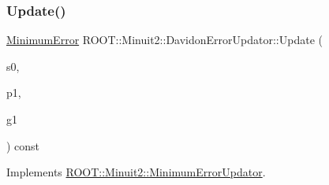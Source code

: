 \subsubsection{\texorpdfstring{Update()}{Update()}\hspace{0.1cm}{\footnotesize\ttfamily [1/3]}}
{\footnotesize\ttfamily \mbox{\hyperlink{classROOT_1_1Minuit2_1_1MinimumError}{Minimum\+Error}} R\+O\+O\+T\+::\+Minuit2\+::\+Davidon\+Error\+Updator\+::\+Update (\begin{DoxyParamCaption}\item[{const \mbox{\hyperlink{classROOT_1_1Minuit2_1_1MinimumState}{Minimum\+State}} \&}]{s0,  }\item[{const \mbox{\hyperlink{classROOT_1_1Minuit2_1_1MinimumParameters}{Minimum\+Parameters}} \&}]{p1,  }\item[{const \mbox{\hyperlink{classROOT_1_1Minuit2_1_1FunctionGradient}{Function\+Gradient}} \&}]{g1 }\end{DoxyParamCaption}) const\hspace{0.3cm}{\ttfamily [virtual]}}



Implements \mbox{\hyperlink{classROOT_1_1Minuit2_1_1MinimumErrorUpdator_ae75c33152c49ebf34e6119adc0bbbda9}{R\+O\+O\+T\+::\+Minuit2\+::\+Minimum\+Error\+Updator}}.

